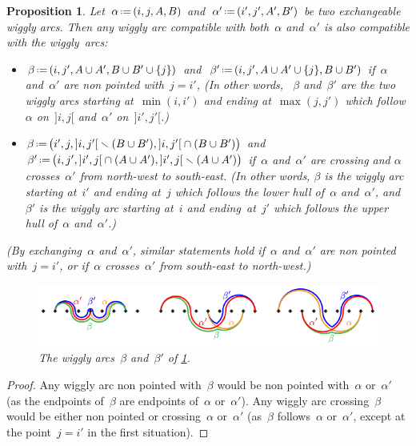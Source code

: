 \documentclass{amsart}
\newtheorem{proposition}[theorem]{Proposition}
\theoremstyle{definition}
\newcommand{\ssm}{\smallsetminus} %
\newcommand{\eqdef}{\mbox{\,\raisebox{0.2ex}{\scriptsize\ensuremath{\mathrm:}}\ensuremath{=}\,}} %
\begin{document}
\begin{proposition}
\label{prop:uerp}
Let~$\alpha \eqdef (i, j, A, B)$ and~$\alpha' \eqdef (i', j', A', B')$ be two exchangeable wiggly arcs.
Then any wiggly arc compatible with both~$\alpha$ and~$\alpha'$ is also compatible with the wiggly~arcs:
\begin{itemize}
\item $\beta \eqdef (i, j', A \cup A', B \cup B' \cup \{j\})$ and~$\beta' \eqdef (i, j', A \cup A' \cup \{j\}, B \cup B')$ if~$\alpha$ and~$\alpha'$ are non pointed with~$j = i'$,
(In other words, ~$\beta$ and~$\beta'$ are the two wiggly arcs starting at~$\min(i,i')$ and ending at~$\max(j,j')$ which follow $\alpha$ on~$]i,j[$ and~$\alpha'$ on~$]i',j'[$.)
\item $\beta \eqdef \big( i', j, {]i,j'[} \ssm (B \cup B'), {]i,j'[} \cap (B \cup B') \big)$ and~$\beta' \eqdef \big( i, j', {]i',j[} \cap (A \cup A'), {]i',j[} \ssm (A \cup A') \big)$ if~$\alpha$ and~$\alpha'$ are crossing and $\alpha$ crosses~$\alpha'$ from north-west to south-east.
(In other words, $\beta$ is the wiggly arc starting at~$i'$ and ending at~$j$ which follows the lower hull of~$\alpha$ and~$\alpha'$, and~$\beta'$ is the wiggly arc starting at~$i$ and ending~at~$j'$ which follows the upper hull of~$\alpha$ and~$\alpha'$.)
\end{itemize}
(By exchanging~$\alpha$ and~$\alpha'$, similar statements hold if~$\alpha$ and~$\alpha'$ are non pointed with~$j = i'$, or if~$\alpha$ crosses~$\alpha'$ from south-east to north-west.)
%
\begin{figure}
\centerline{\includegraphics[scale=1.3]{incompatible3}}
\caption{The wiggly arcs~$\beta$ and~$\beta'$ of \cref{prop:uerp}.}
\label{fig:incompatible3}
\end{figure}
\end{proposition}

\begin{proof}
Any wiggly arc non pointed with~$\beta$ would be non pointed with~$\alpha$ or~$\alpha'$ (as the endpoints of~$\beta$ are endpoints of~$\alpha$ or~$\alpha'$).
Any wiggly arc crossing~$\beta$ would be either non pointed or crossing~$\alpha$ or~$\alpha'$ (as~$\beta$ follows~$\alpha$ or~$\alpha'$, except at the point~$j = i'$ in the first situation).
\end{proof}
\end{document}

